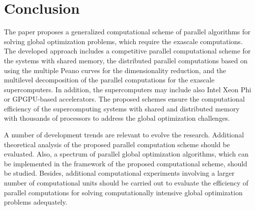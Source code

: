 \documentclass[12pt]{amsart}
\begin{document}
\section{Conclusion}

The paper proposes a generalized computational scheme of parallel algorithms for solving global optimization problems, which require the exascale computations. The developed approach includes a competitive parallel computational scheme for the systems with shared memory, the distributed parallel computations based on using the multiple Peano curves for the dimensionality reduction, and the multilevel decomposition of the parallel computations for the exascale supercomputers. In addition, the supercomputers may include also Intel Xeon Phi or GPGPU-based accelerators. The proposed schemes ensure the computational efficiency of the supercomputing systems with shared and distributed memory with thousands of processors to address the global optimization challenges.

A number of development trends are relevant to evolve the research. Additional theoretical analysis of the proposed parallel computation scheme should be evaluated. Also, a spectrum of parallel global optimization algorithms, which can be implemented in the framework of the proposed computational scheme, should be studied. Besides, additional computational experiments involving a larger number of computational units should be carried out to evaluate the efficiency of parallel computations for solving computationally intensive global optimization problems adequately.


\end{document}
